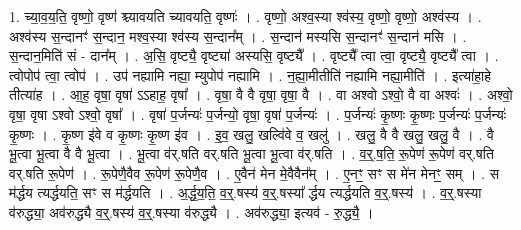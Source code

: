 \documentclass[17pt]{extarticle}
\begin{document}
1. च्या॒व॒य॒ति॒ वृष्णो॒ वृष्ण॑ श्च्यावयति च्यावयति॒ वृष्णः॑ । . वृष्णो॒ अश्व॒स्या श्व॑स्य॒ वृष्णो॒ वृष्णो॒ अश्व॑स्य । . अश्व॑स्य स॒न्दानꣳ॑ स॒न्दान॒ मश्व॒स्या श्व॑स्य स॒न्दान᳚म् । . स॒न्दान॑ मस्यसि स॒न्दानꣳ॑ स॒न्दान॑ मसि । . स॒न्दान॒मिति॑ सं - दान᳚म् । . अ॒सि॒ वृष्ट्यै॒ वृष्ट्या॑ अस्यसि॒ वृष्ट्यै᳚ । . वृष्ट्यै᳚ त्वा त्वा॒ वृष्ट्यै॒ वृष्ट्यै᳚ त्वा । . त्वोपोप॑ त्वा॒ त्वोप॑ । . उप॑ नह्यामि नह्या॒ म्युपोप॑ नह्यामि । . न॒ह्या॒मीतीति॑ नह्यामि नह्या॒मीति॑ । . इत्या॑हा॒हे तीत्या॑ह । . आ॒ह॒ वृषा॒ वृषा॑ ऽऽहाह॒ वृषा᳚ । . वृषा॒ वै वै वृषा॒ वृषा॒ वै । . वा अश्वो ऽश्वो॒ वै वा अश्वः॑ । . अश्वो॒ वृषा॒ वृषा ऽश्वो ऽश्वो॒ वृषा᳚ । . वृषा॑ प॒र्जन्यः॑ प॒र्जन्यो॒ वृषा॒ वृषा॑ प॒र्जन्यः॑ । . प॒र्जन्यः॑ कृ॒ष्णः कृ॒ष्णः प॒र्जन्यः॑ प॒र्जन्यः॑ कृ॒ष्णः । . कृ॒ष्ण इ॑वे व कृ॒ष्णः कृ॒ष्ण इ॑व । . इ॒व॒ खलु॒ खल्वि॑वे व॒ खलु॑ । . खलु॒ वै वै खलु॒ खलु॒ वै । . वै भू॒त्वा भू॒त्वा वै वै भू॒त्वा । . भू॒त्वा व॑र्.षति वर्.षति भू॒त्वा भू॒त्वा व॑र्.षति । . व॒र्॒.ष॒ति॒ रू॒पेण॑ रू॒पेण॑ वर्.षति वर्.षति रू॒पेण॑ । . रू॒पेणै॒वैव रू॒पेण॑ रू॒पेणै॒व । . ए॒वैन॑ मेन मे॒वैवैन᳚म् । . ए॒नꣳ॒॒ सꣳ स मे॑न मेनꣳ॒॒ सम् । . स म॑र्द्धय त्यर्द्धयति॒ सꣳ स म॑र्द्धयति । . अ॒र्द्ध॒य॒ति॒ व॒र्॒.षस्य॑ व॒र्॒.षस्या᳚ र्द्धय त्यर्द्धयति व॒र्॒.षस्य॑ । . व॒र्॒.षस्या व॑रुद्ध्या॒ अव॑रुद्ध्यै व॒र्॒.षस्य॑ व॒र्॒.षस्या व॑रुद्ध्यै । . अव॑रुद्ध्या॒ इत्यव॑ - रु॒द्ध्यै॒ । \newline
\end{document}
